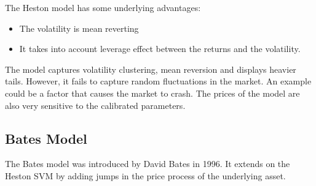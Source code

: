 \documentclass{article}
\begin{document}
The Heston model has some underlying advantages: 
\begin{itemize}
    \item The volatility is mean reverting
    \item It takes into account leverage effect between the returns and the volatility.
\end{itemize}

The model captures volatility clustering, mean reversion and displays heavier tails. However, it fails to capture random fluctuations in the market. An example could be a factor that causes the market to crash. The prices of the model are also very sensitive to the calibrated parameters. 

\subsection{Bates Model}
The Bates model was introduced by David Bates in 1996. It extends on the Heston SVM by  adding jumps in the price process of the underlying asset. 
\end{document}
